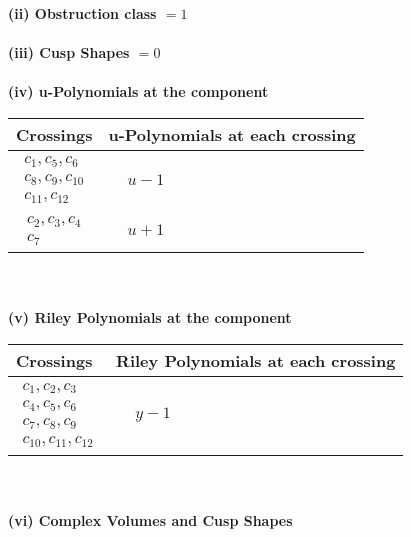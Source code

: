 \documentclass[1p]{elsarticle_modified}
\theoremstyle{definition}
\begin{document}
\flushleft \textbf{(ii) Obstruction class $= 1$}\\~\\
\flushleft \textbf{(iii) Cusp Shapes $= 0$}\\~\\
\newpage\renewcommand{\arraystretch}{1}
\flushleft \textbf{(iv) u-Polynomials at the component}\newline \\
\begin{tabular}{m{50pt}|m{274pt}}
Crossings & \hspace{64pt}u-Polynomials at each crossing \\
\hline $$\begin{aligned}c_{1},c_{5},c_{6}\\c_{8},c_{9},c_{10}\\c_{11},c_{12}\end{aligned}$$&$\begin{aligned}
&u-1
\end{aligned}$\\
\hline $$\begin{aligned}c_{2},c_{3},c_{4}\\c_{7}\end{aligned}$$&$\begin{aligned}
&u+1
\end{aligned}$\\
\hline
\end{tabular}\\~\\
\newpage\renewcommand{\arraystretch}{1}
\flushleft \textbf{(v) Riley Polynomials at the component}\newline \\
\begin{tabular}{m{50pt}|m{274pt}}
Crossings & \hspace{64pt}Riley Polynomials at each crossing \\
\hline $$\begin{aligned}c_{1},c_{2},c_{3}\\c_{4},c_{5},c_{6}\\c_{7},c_{8},c_{9}\\c_{10},c_{11},c_{12}\end{aligned}$$&$\begin{aligned}
&y-1
\end{aligned}$\\
\hline
\end{tabular}\\~\\
\newpage\flushleft \textbf{(vi) Complex Volumes and Cusp Shapes}
\end{document}
